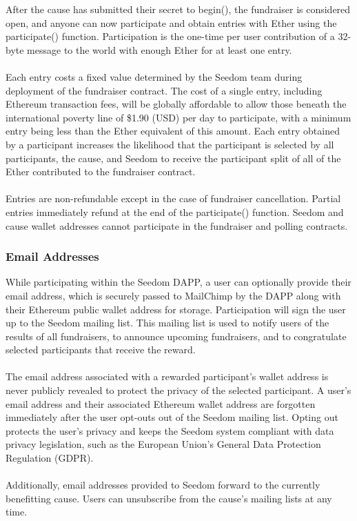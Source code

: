\documentclass[11pt]{article}
\begin{document}
After the cause has submitted their secret to begin(), the fundraiser is considered open, and anyone can now participate and obtain entries with Ether using the participate() function. Participation is the one-time per user contribution of a 32-byte message to the world with enough Ether for at least one entry.\\\\
Each entry costs a fixed value determined by the Seedom team during deployment of the fundraiser contract. The cost of a single entry, including Ethereum transaction fees, will be globally affordable to allow those beneath the international poverty line of \$1.90 (USD) per day \cite{1} to participate, with a minimum entry being less than the Ether equivalent of this amount. Each entry obtained by a participant increases the likelihood that the participant is selected by all participants, the cause, and Seedom to receive the participant split of all of the Ether contributed to the fundraiser contract.\\\\
Entries are non-refundable except in the case of fundraiser cancellation. Partial entries immediately refund at the end of the participate() function. Seedom and cause wallet addresses cannot participate in the fundraiser and polling contracts.

\subsubsection{Email Addresses}

While participating within the Seedom DAPP, a user can optionally provide their email address, which is securely passed to MailChimp by the DAPP along with their Ethereum public wallet address for storage. Participation will sign the user up to the Seedom mailing list. This mailing list is used to notify users of the results of all fundraisers, to announce upcoming fundraisers, and to congratulate selected participants that receive the reward.\\\\
The email address associated with a rewarded participant's wallet address is never publicly revealed to protect the privacy of the selected participant. A user's email address and their associated Ethereum wallet address are forgotten immediately after the user opt-outs out of the Seedom mailing list. Opting out protects the user's privacy and keeps the Seedom system compliant with data privacy legislation, such as the European Union's General Data Protection Regulation (GDPR).\\\\
Additionally, email addresses provided to Seedom forward to the currently benefitting cause. Users can unsubscribe from the cause's mailing lists at any time.
\end{document}
